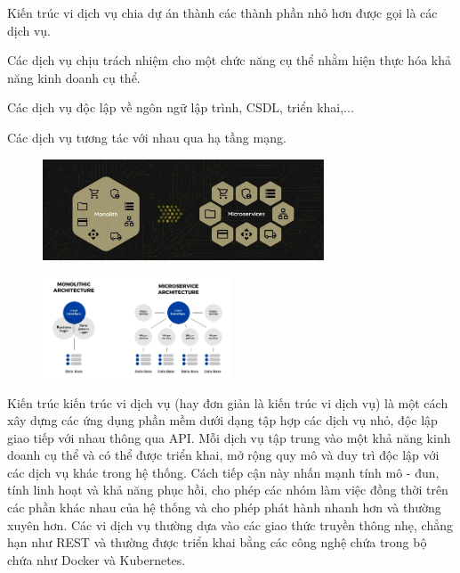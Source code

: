 Kiến trúc vi dịch vụ chia dự án thành các thành phần nhỏ hơn được gọi là các dịch vụ.

Các dịch vụ chịu trách nhiệm cho một chức năng cụ thể nhằm hiện thực hóa khả năng kinh doanh cụ thể.

Các dịch vụ độc lập về ngôn ngữ lập trình, CSDL, triển khai,...

Các dịch vụ tương tác với nhau qua hạ tầng mạng.

\begin{figure}[h]

\centering

\includegraphics[height = 3cm]{pictures/ChuyenTu_KienTrucNguyenKhoi_Sang_KienTrucViDichVu.jpg}


\end{figure}

\begin{figure}[h]

\centering

\includegraphics[height = 3cm]{pictures/AnhKhacNhau_KienTrucNguyenKhoi_KienTrucViDichVu.png}


\end{figure}


Kiến trúc kiến trúc vi dịch vụ (hay đơn giản là kiến trúc vi dịch vụ) là một cách xây dựng các ứng dụng phần mềm dưới dạng tập hợp các dịch vụ nhỏ, độc lập giao tiếp với nhau thông qua API. Mỗi dịch vụ tập trung vào một khả năng kinh doanh cụ thể và có thể được triển khai, mở rộng quy mô và duy trì độc lập với các dịch vụ khác trong hệ thống. Cách tiếp cận này nhấn mạnh tính mô - đun, tính linh hoạt và khả năng phục hồi, cho phép các nhóm làm việc đồng thời trên các phần khác nhau của hệ thống và cho phép phát hành nhanh hơn và thường xuyên hơn. Các vi dịch vụ thường dựa vào các giao thức truyền thông nhẹ, chẳng hạn như REST và thường được triển khai bằng các công nghệ chứa trong bộ chứa như Docker và Kubernetes.

